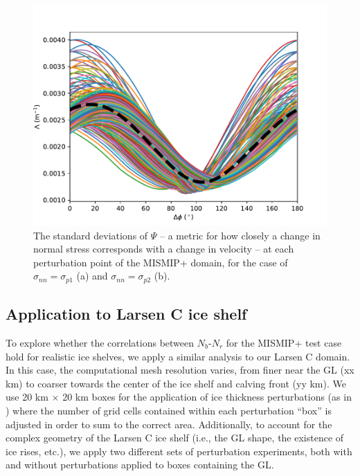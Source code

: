 \documentclass[review,oneside]{igs}
\begin{document}
\begin{figure}
	\centering
    \includegraphics[width=1\linewidth]{figs/new_metric_new.pdf}
    \caption{The standard deviations of $\Psi$ -- a metric for how closely a change in normal stress corresponds with a change in velocity -- at each perturbation point of the MISMIP+ domain, for the case of $\sigma_{nn}=\sigma_{p1}$ (a) and $\sigma_{nn}=\sigma_{p2}$ (b).}
	\label{new_metric_new}
\end{figure}


\subsection{Application to Larsen C ice shelf}

To explore whether the correlations between $N_b$-$N_r$ for the MISMIP+ test case hold for realistic ice shelves, we apply a similar analysis to our Larsen C domain. In this case, the computational mesh resolution varies, from finer near the GL (xx km) to coarser towards the center of the ice shelf and calving front (yy km). We use 20 km $\times$ 20 km boxes for the application of ice thickness perturbations (as in \citet{reese2018}) where the number of grid cells contained within each perturbation ``box'' is adjusted in order to sum to the correct area. Additionally, to account for the complex geometry of the Larsen C ice shelf (i.e., the GL shape, the existence of ice rises, etc.), we apply two different sets of perturbation experiments, both with and without perturbations applied to boxes containing the GL. %
\end{document}
